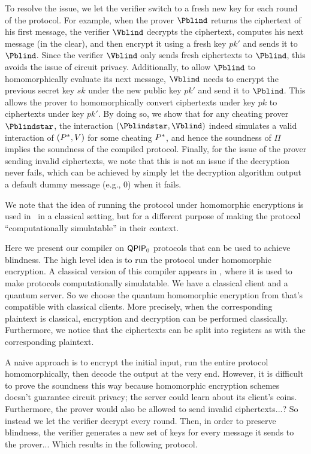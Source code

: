 To resolve the issue, we let the verifier switch to a fresh new key for each round of the protocol. For example, when the prover $\Pblind$ returns the ciphertext of his first message, the verifier $\Vblind$ decrypts the ciphertext, computes his next message (in the clear), and then encrypt it using a fresh key $pk'$ and sends it to $\Pblind$. Since the verifier $\Vblind$ only  sends fresh ciphertexts to $\Pblind$, this avoids the issue of circuit privacy. Additionally, to allow $\Pblind$ to homomorphically evaluate its next message, $\Vblind$ needs to encrypt the previous secret key $sk$ under the new public key $pk'$ and send it to $\Pblind$. This allows the prover to homomorphically convert ciphertexts under key $pk$ to ciphertexts under key $pk'$. By doing so, we show that for any cheating prover $\Pblindstar$, the interaction $(\Pblindstar, \Vblind)$ indeed simulates a valid interaction of $(P^*, V)$ for some cheating $P^*$, and hence the soundness of $\Pi$ implies the soundness of the compiled protocol. Finally, for the issue of the prover sending invalid ciphertexts, we note that this is not an issue if the decryption never fails, which can be achieved by simply let the decryption algorithm output a default dummy message (e.g., $0$) when it fails. 

We note that the idea of running the protocol under homomorphic encryptions is used in~\cite{KMThesis} in a classical setting, but for a different purpose of making the protocol ``computationally simulatable'' in their context.

\iffalse
 

Here we present our compiler on $\operatorname{\mathsf{QPIP}}_0$ protocols that can be used to achieve blindness.
The high level idea is to run the protocol under homomorphic encryption.
A classical version of this compiler appears in \cite{KMThesis}, where it is used to make protocols computationally simulatable.
We have a classical client and a quantum server.
So we choose the quantum homomorphic encryption from \cite{mahadev_qfhe} that's compatible with classical clients.
More precisely, when the corresponding plaintext is classical, encryption and decryption can be performed classically.
Furthermore, we notice that the ciphertexts can be split into registers as with the corresponding plaintext.

A naive approach is to encrypt the initial input,
run the entire protocol homomorphically,
then decode the output at the very end.
However, it is difficult to prove the soundness this way because homomorphic encryption schemes doesn't guarantee circuit privacy;
the server could learn about its client's coins.
Furthermore, the prover would also be allowed to send invalid ciphertexts...?
So instead we let the verifier decrypt every round.
Then, in order to preserve blindness, the verifier generates a new set of keys for every message it sends to the prover...
Which results in the following protocol.

